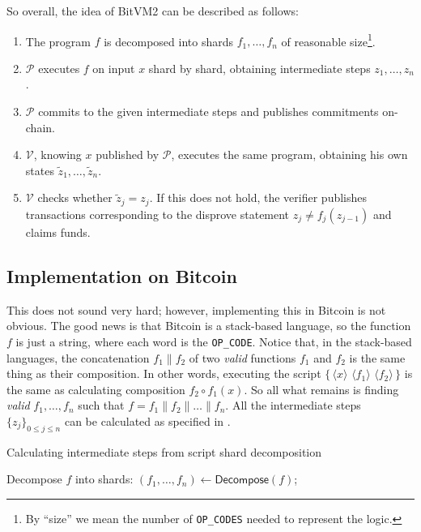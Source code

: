 \documentclass{iacrtrans}
\newcommand{\elem}[1]{\, \langle #1 \rangle \,}
\newcommand{\script}[1]{ $\big\{ #1 \big\}$ }
\begin{document}
So overall, the idea of BitVM2 can be described as follows:
\begin{enumerate}
    \item The program $f$ is decomposed into shards $f_1,\dots,f_n$ of reasonable size\footnote{By ``size'' we mean the number of \texttt{OP\_CODES} needed to represent the logic.}.
    \item $\mathcal{P}$ executes $f$ on input ${x}$ shard by shard, obtaining intermediate steps ${z}_1,\dots,{z}_n$.
    \item $\mathcal{P}$ commits to the given intermediate steps and publishes commitments on-chain.
    \item $\mathcal{V}$, knowing ${x}$ published by $\mathcal{P}$, executes the same program, obtaining his own states $\widetilde{z}_1,\dots,\widetilde{z}_n$.
    \item $\mathcal{V}$ checks whether $\widetilde{z}_j = z_j$. If this does not hold, the verifier publishes transactions corresponding to the disprove statement $z_j \neq f_j(z_{j-1})$ and claims funds.
\end{enumerate}

\subsection{Implementation on Bitcoin}

This does not sound very hard; however, 
implementing this in Bitcoin is not obvious. 
The good news is that Bitcoin is a stack-based language, 
so the function $f$ is just a string, 
where each word is the \texttt{OP\_CODE}. Notice that, 
in the stack-based languages, the concatenation 
$f_1 \parallel f_2$ of two \textit{valid} functions 
$f_1$ and $f_2$ is the same thing as their composition. 
In other words, executing the script \script{\elem{x} \elem{f_1} \elem{f_2}}
is the same as calculating composition $f_2 \circ f_1(x)$. 
So all what remains is finding \textit{valid} $f_1,\dots,f_n$ such that $f = f_1 \parallel f_{2} \parallel \dots \parallel f_n$. All the intermediate steps $\{z_j\}_{0 \leq j \leq n}$ can be calculated as specified in .

\begin{algorithm}[H]
\caption{Calculating intermediate steps from script shard decomposition}

Decompose $f$ into shards: $(f_1,\dots,f_n) \gets \mathsf{Decompose}(f)$;

\For{$i \in \{1,\dots,n\}$}{
    $z_i \gets \mathsf{Exec}(\{\elem{z_{i-1}} \elem{f_i}\})$;
}

\label{alg:intermediate_steps}
\end{algorithm}
\end{document}
